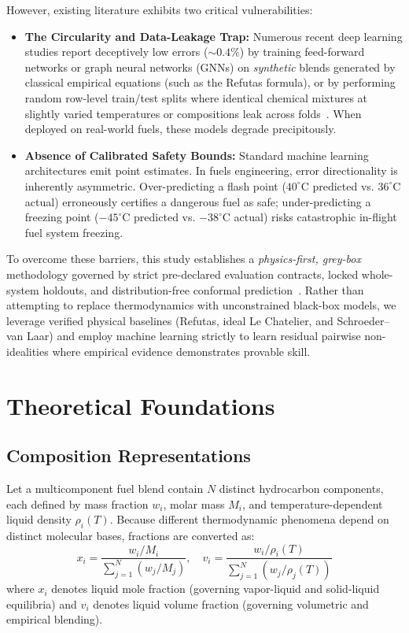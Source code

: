 \documentclass[11pt,a4paper]{article}
\begin{document}
However, existing literature exhibits two critical vulnerabilities:
\begin{itemize}
    \item \textbf{The Circularity and Data-Leakage Trap:} Numerous recent deep learning studies report deceptively low errors ($\sim 0.4\%$) by training feed-forward networks or graph neural networks (GNNs) on \textit{synthetic} blends generated by classical empirical equations (such as the Refutas formula), or by performing random row-level train/test splits where identical chemical mixtures at slightly varied temperatures or compositions leak across folds~\cite{leenhouts2024benchmarking}. When deployed on real-world fuels, these models degrade precipitously.
    \item \textbf{Absence of Calibrated Safety Bounds:} Standard machine learning architectures emit point estimates. In fuels engineering, error directionality is inherently asymmetric. Over-predicting a flash point ($40^\circ\text{C}$ predicted vs. $36^\circ\text{C}$ actual) erroneously certifies a dangerous fuel as safe; under-predicting a freezing point ($-45^\circ\text{C}$ predicted vs. $-38^\circ\text{C}$ actual) risks catastrophic in-flight fuel system freezing.
\end{itemize}

To overcome these barriers, this study establishes a \textit{physics-first, grey-box} methodology governed by strict pre-declared evaluation contracts, locked whole-system holdouts, and distribution-free conformal prediction~\cite{vovk2005algorithmic, angelopoulos2023conformal}. Rather than attempting to replace thermodynamics with unconstrained black-box models, we leverage verified physical baselines (Refutas, ideal Le Chatelier, and Schroeder--van Laar) and employ machine learning strictly to learn residual pairwise non-idealities where empirical evidence demonstrates provable skill.

\section{Theoretical Foundations}

\subsection{Composition Representations}
Let a multicomponent fuel blend contain $N$ distinct hydrocarbon components, each defined by mass fraction $w_i$, molar mass $M_i$, and temperature-dependent liquid density $\rho_i(T)$. Because different thermodynamic phenomena depend on distinct molecular bases, fractions are converted as:
\begin{equation}
    x_i = \frac{w_i / M_i}{\sum_{j=1}^N (w_j / M_j)}, \quad v_i = \frac{w_i / \rho_i(T)}{\sum_{j=1}^N (w_j / \rho_j(T))}
\end{equation}
where $x_i$ denotes liquid mole fraction (governing vapor-liquid and solid-liquid equilibria) and $v_i$ denotes liquid volume fraction (governing volumetric and empirical blending).
\end{document}
